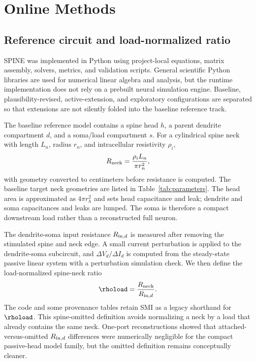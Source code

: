 \section{Online Methods}

\subsection{Reference circuit and load-normalized ratio}

SPINE was implemented in Python using project-local equations, matrix assembly, solvers, metrics, and validation scripts. General scientific Python libraries are used for numerical linear algebra and analysis, but the runtime implementation does not rely on a prebuilt neural simulation engine. Baseline, plausibility-revised, active-extension, and exploratory configurations are separated so that extensions are not silently folded into the baseline reference track.

The baseline reference model contains a spine head $h$, a parent dendrite compartment $d$, and a soma/load compartment $s$. For a cylindrical spine neck with length $L_n$, radius $r_n$, and intracellular resistivity $\rho_i$,
\begin{equation}
R_{\mathrm{neck}}=\frac{\rho_i L_n}{\pi r_n^2},
\label{eq:rneck}
\end{equation}
with geometry converted to centimeters before resistance is computed. The baseline target neck geometries are listed in Table~\ref{tab:parameters}. The head area is approximated as $4\pi r_h^2$ and sets head capacitance and leak; dendrite and soma capacitances and leaks are lumped. The soma is therefore a compact downstream load rather than a reconstructed full neuron.

The dendrite-soma input resistance $R_{\mathrm{in},d}$ is measured after removing the stimulated spine and neck edge. A small current perturbation is applied to the dendrite-soma subcircuit, and $\Delta V_d/\Delta I_d$ is computed from the steady-state passive linear system with a perturbation simulation check. We then define the load-normalized spine-neck ratio
\begin{equation}
\rhoload=\frac{\Rneck}{\Rin}.
\end{equation}
The code and some provenance tables retain SMI as a legacy shorthand for $\rhoload$. This spine-omitted definition avoids normalizing a neck by a load that already contains the same neck. One-port reconstructions showed that attached-versus-omitted $R_{\mathrm{in},d}$ differences were numerically negligible for the compact passive-head model family, but the omitted definition remains conceptually cleaner.

